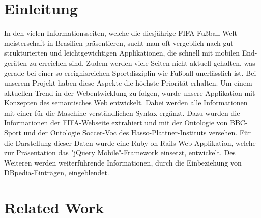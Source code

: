 \documentclass[runningheads,a4paper]{llncs}
\begin{document}
\section{Einleitung}

In den vielen Informationsseiten, welche die diesjährige FIFA Fußball-Welt-meisterschaft in Brasilien präsentieren, sucht man oft vergeblich nach gut strukturierten und leichtgewichtigen Applikationen, die schnell mit mobilen End-geräten zu erreichen sind. Zudem werden viele Seiten nicht aktuell gehalten, was gerade bei einer so ereignisreichen Sportdisziplin wie Fußball unerlässlich ist. Bei unserem Projekt haben diese Aspekte die höchste Priorität erhalten. Um einem aktuellen Trend in der Webentwicklung zu folgen, wurde unsere Applikation mit Konzepten des semantisches Web entwickelt. Dabei werden alle Informationen mit einer für die Maschine verständlichen Syntax ergänzt. Dazu wurden die Informationen der FIFA-Webseite extrahiert und mit der Ontologie von BBC-Sport und der Ontologie Soccer-Voc des Hasso-Plattner-Instituts versehen. Für die Darstellung dieser Daten wurde eine Ruby on Rails Web-Applikation, welche zur Präsentation das "jQuery Mobile"{}-Framework einsetzt, entwickelt. Des Weiteren werden weiterführende Informationen, durch die Einbeziehung von DBpedia-Einträgen, eingeblendet.    


\section{Related Work}
\end{document}
